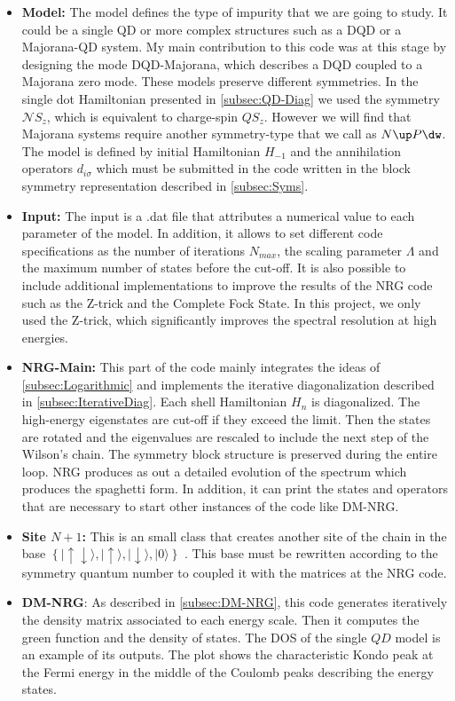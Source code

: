 \begin{itemize}
\item \textbf{Model:} The model defines the type of impurity that we are going to study. It could be a single QD or more complex structures such as a DQD or a Majorana-QD system. My main contribution to this code was at this stage by designing the mode DQD-Majorana, which describes a DQD coupled to a Majorana zero mode. These models preserve different symmetries. In the single dot Hamiltonian presented in \ref{subsec:QD-Diag} we used the symmetry $\mathcal{N}S_z$, which is equivalent to charge-spin $QS_z$. However we will find that Majorana systems  require another  symmetry-type that we call as $N\up P\dw$. The model is defined by initial Hamiltonian $H_{-1}$ and the annihilation operators $d_{i\sigma}$ which must be submitted in the code written in the block symmetry representation described in \ref{subsec:Syms}.
\item \textbf{Input:} The input is a .dat file that attributes a numerical value to each parameter of the model. In addition, it allows to set different code specifications as the number of iterations $N_{max}$, the scaling parameter $\Lambda$ and the maximum number of states before the cut-off. It is also possible to include additional implementations to improve the results of the NRG code such as the Z-trick \cite{oliveira_generalized_1994} and the Complete Fock State. In this project, we only used the Z-trick, which significantly improves the spectral resolution at high energies.
\item \textbf{NRG-Main:} This part of the code mainly integrates the ideas of \ref{subsec:Logarithmic} and implements the iterative diagonalization described in \ref{subsec:IterativeDiag}. Each shell Hamiltonian $H_n$ is diagonalized. The high-energy eigenstates are cut-off if they exceed the limit. Then the states are rotated and the eigenvalues are rescaled to include the next step of the Wilson's chain. The symmetry block structure is preserved during the entire loop. NRG produces as out a detailed evolution of the spectrum which produces the spaghetti form. In addition, it can print the states and operators that are necessary to start other instances of the code like DM-NRG.
\item \textbf{Site $N+1$:} This is an small class that creates another site of the chain in the base $\left\{ \vert\uparrow\!\downarrow\rangle,\vert\uparrow\rangle,\vert\downarrow\rangle,\vert0\rangle\right\} $ . This base must be rewritten according to the symmetry quantum number to coupled it with the matrices at the NRG code. 
\item \textbf{DM-NRG}: As described in \ref{subsec:DM-NRG}, this code generates iteratively the density matrix associated to each energy scale. Then it computes the green function and the density of states. The DOS of the single $QD$ model is an example of its outputs. The plot shows the characteristic Kondo peak at the Fermi energy in the middle of the Coulomb peaks describing the energy states. 
\end{itemize}

